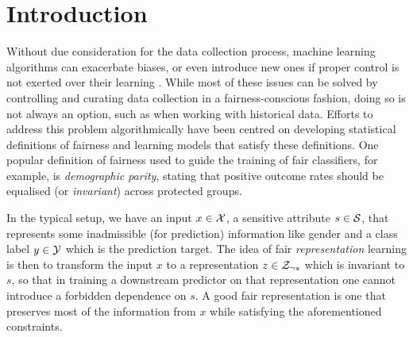 \section{Introduction}
Without due consideration for the data collection process, machine learning algorithms can
exacerbate biases, or even introduce new ones if proper control is not exerted over their learning
\citep{holstein2019improving}. 
%
While most of these issues can be solved by controlling and curating data collection in a
fairness-conscious fashion, doing so is not always an option, such as when working with historical
data. 
%
Efforts to address this problem algorithmically have been centred on developing statistical
definitions of fairness and learning models that satisfy these definitions. 
%
One popular definition of fairness used to guide the training of fair classifiers, for example, is
\emph{demographic parity}, stating that positive outcome rates should be equalised (or
\emph{invariant}) across protected groups.

In the typical setup, we have an input $x \in {\mathcal{X}}$, a sensitive attribute $s \in {\mathcal{S}}$, that
represents some inadmissible (for prediction) information like gender and a class label $y \in {\mathcal{Y}}$
which is the prediction target. 
%
The idea of fair \emph{representation} learning
\citep{zemel2013learning,edwards2016censoring,madras2018learning} is then to transform the input
$x$ to a representation $z \in {\mathcal{Z}}_{\neg s}$ which is invariant to $s$, so that in training a
downstream predictor on that representation one cannot introduce a forbidden dependence on $s$.
A good fair representation is one that preserves most of the information from $x$ while
satisfying the aforementioned constraints.

